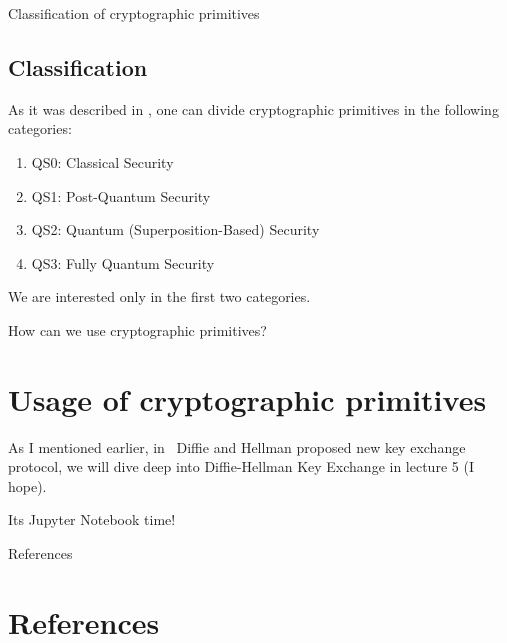 \documentclass{beamer}
\begin{document}
\begin{frame}{Classification of cryptographic primitives}
    \subsection{Classification}
    As it was described in \cite{gagliardoni2017quantum}, one can divide 
    cryptographic primitives in the following categories:
    \begin{enumerate}
        \item QS0: Classical Security
        \item QS1: Post-Quantum Security
        \item QS2: Quantum (Superposition-Based) Security
        \item QS3: Fully Quantum Security
    \end{enumerate}
    We are interested only in the first two categories.
\end{frame}

\begin{frame}{How can we use cryptographic primitives?}
    \section{Usage of cryptographic primitives}
    \begin{example}
        As I mentioned earlier, in~\cite{diffie-hellman:1976} Diffie and Hellman
        proposed new key exchange protocol, we will dive deep into Diffie-Hellman 
        Key Exchange in lecture 5 (I hope).
    \end{example}
\end{frame}

\begin{frame}
    Its Jupyter Notebook time!
\end{frame}

\begin{frame}[allowframebreaks]{References}
	\section*{References}
	
	
\end{frame}
\end{document}
